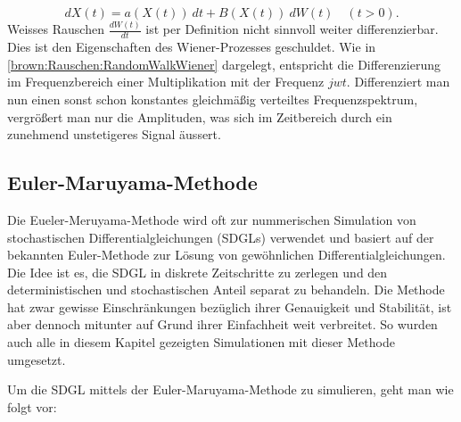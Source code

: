 \begin{equation}
	dX(t) = a(X(t)) \ dt + B(X(t)) \ dW(t) \quad (t>0).
\end{equation}
Weisses Rauschen $ \frac{dW(t)}{dt} $ ist per Definition nicht sinnvoll weiter differenzierbar. Dies ist den Eigenschaften des Wiener-Prozesses geschuldet. Wie in \ref{brown:Rauschen:RandomWalkWiener} dargelegt, entspricht die Differenzierung im Frequenzbereich einer Multiplikation mit der Frequenz $ jwt $. Differenziert man nun einen sonst schon konstantes gleichmäßig verteiltes Frequenzspektrum, vergrößert man nur die Amplituden, was sich im Zeitbereich durch ein zunehmend unstetigeres Signal äussert.



\subsection{Euler-Maruyama-Methode\label{brown:Simulation}}

Die Eueler-Meruyama-Methode wird oft zur nummerischen Simulation von stochastischen Differentialgleichungen (SDGLs) verwendet und basiert auf der bekannten Euler-Methode zur Lösung von gewöhnlichen Differentialgleichungen. Die Idee ist es, die SDGL in diskrete Zeitschritte zu zerlegen und den deterministischen und stochastischen Anteil separat zu behandeln. Die Methode hat zwar gewisse Einschränkungen bezüglich ihrer Genauigkeit und Stabilität, ist aber dennoch mitunter auf Grund ihrer Einfachheit weit verbreitet. So wurden auch alle in diesem Kapitel gezeigten Simulationen mit dieser Methode umgesetzt. 





Um die SDGL mittels der Euler-Maruyama-Methode zu simulieren, geht man wie folgt vor:

